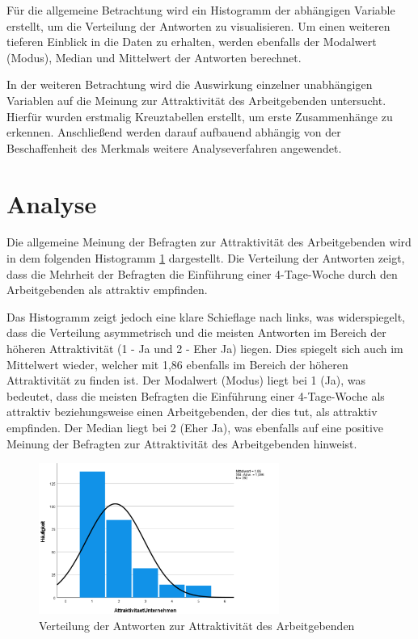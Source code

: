 Für die allgemeine Betrachtung wird ein Histogramm der abhängigen Variable erstellt, um die Verteilung 
der Antworten zu visualisieren. Um einen weiteren tieferen Einblick in die Daten zu erhalten, werden 
ebenfalls der Modalwert (Modus), Median und Mittelwert der Antworten berechnet.

In der weiteren Betrachtung wird die Auswirkung einzelner unabhängigen Variablen auf die Meinung zur 
Attraktivität des Arbeitgebenden untersucht. Hierfür wurden erstmalig Kreuztabellen erstellt, um erste
Zusammenhänge zu erkennen. Anschließend werden darauf aufbauend abhängig von der Beschaffenheit des Merkmals
weitere Analyseverfahren angewendet.

\section{Analyse}

Die allgemeine Meinung der Befragten zur Attraktivität des Arbeitgebenden wird in dem folgenden Histogramm 
\ref{fig:attraktivitaet_verteilung} dargestellt. Die Verteilung der Antworten zeigt, dass die Mehrheit der
Befragten die Einführung einer 4-Tage-Woche durch den Arbeitgebenden als attraktiv empfinden.

Das Histogramm zeigt jedoch eine klare Schieflage nach links, was widerspiegelt, dass die Verteilung 
asymmetrisch und die meisten Antworten im Bereich der höheren Attraktivität (1 - Ja und 2 - Eher Ja) liegen. 
Dies spiegelt sich auch im Mittelwert wieder, welcher mit 1,86 ebenfalls im Bereich der höheren Attraktivität
zu finden ist. Der Modalwert (Modus) liegt bei 1 (Ja), was bedeutet, dass die meisten Befragten die Einführung einer 
4-Tage-Woche als attraktiv beziehungsweise einen Arbeitgebenden, der dies tut, als attraktiv empfinden. Der Median
liegt bei 2 (Eher Ja), was ebenfalls auf eine positive Meinung der Befragten zur Attraktivität des Arbeitgebenden
hinweist.


\begin{figure}[h]
    \centering
    \includegraphics[width=0.7\textwidth]{04_Artefakte/01_Abbildungen/hypothese_5/attraktivitaet_histogram.png}
    \caption{Verteilung der Antworten zur Attraktivität des Arbeitgebenden}
    \label{fig:attraktivitaet_verteilung}
\end{figure}

